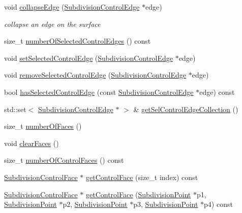 \begin{DoxyCompactItemize}
\item 
void \hyperlink{classShipCAD_1_1SubdivisionSurface_acb0b35c10fe6ab3c348f8435a1ca844d}{collapse\+Edge} (\hyperlink{classShipCAD_1_1SubdivisionControlEdge}{Subdivision\+Control\+Edge} $\ast$edge)
\begin{DoxyCompactList}\small\item\em collapse an edge on the surface \end{DoxyCompactList}\item 
size\+\_\+t \hyperlink{classShipCAD_1_1SubdivisionSurface_a5de7174c531ef00c607948496b3a8780}{number\+Of\+Selected\+Control\+Edges} () const 
\item 
void \hyperlink{classShipCAD_1_1SubdivisionSurface_ae1ceb8323935d0734fe4dc9c324aca16}{set\+Selected\+Control\+Edge} (\hyperlink{classShipCAD_1_1SubdivisionControlEdge}{Subdivision\+Control\+Edge} $\ast$edge)
\item 
void \hyperlink{classShipCAD_1_1SubdivisionSurface_a579077d742f9afc4e1d4ad20ef5a2184}{remove\+Selected\+Control\+Edge} (\hyperlink{classShipCAD_1_1SubdivisionControlEdge}{Subdivision\+Control\+Edge} $\ast$edge)
\item 
bool \hyperlink{classShipCAD_1_1SubdivisionSurface_a02868e9e5c98a74ce433cff169321967}{has\+Selected\+Control\+Edge} (const \hyperlink{classShipCAD_1_1SubdivisionControlEdge}{Subdivision\+Control\+Edge} $\ast$edge) const 
\item 
std\+::set$<$ \hyperlink{classShipCAD_1_1SubdivisionControlEdge}{Subdivision\+Control\+Edge} $\ast$ $>$ \& \hyperlink{classShipCAD_1_1SubdivisionSurface_ae6b7b4127e9c43273fcbf0cdeb88470d}{get\+Sel\+Control\+Edge\+Collection} ()
\item 
size\+\_\+t \hyperlink{classShipCAD_1_1SubdivisionSurface_a9f67bb8bbd3a8f61a2b4abacc0cf10e4}{number\+Of\+Faces} ()
\item 
void \hyperlink{classShipCAD_1_1SubdivisionSurface_abf11847b9df1bc590c6c51d292430dd5}{clear\+Faces} ()
\item 
size\+\_\+t \hyperlink{classShipCAD_1_1SubdivisionSurface_a6a735e1f8b3fdef0469ead5ed006e2a0}{number\+Of\+Control\+Faces} () const 
\item 
\hyperlink{classShipCAD_1_1SubdivisionControlFace}{Subdivision\+Control\+Face} $\ast$ \hyperlink{classShipCAD_1_1SubdivisionSurface_a9c7cbe0869e354a8aa43a43725abcfe8}{get\+Control\+Face} (size\+\_\+t index) const 
\item 
\hyperlink{classShipCAD_1_1SubdivisionControlFace}{Subdivision\+Control\+Face} $\ast$ \hyperlink{classShipCAD_1_1SubdivisionSurface_ad9de0db3b1f18a32edfb3bbbaed77bf0}{get\+Control\+Face} (\hyperlink{classShipCAD_1_1SubdivisionPoint}{Subdivision\+Point} $\ast$p1, \hyperlink{classShipCAD_1_1SubdivisionPoint}{Subdivision\+Point} $\ast$p2, \hyperlink{classShipCAD_1_1SubdivisionPoint}{Subdivision\+Point} $\ast$p3, \hyperlink{classShipCAD_1_1SubdivisionPoint}{Subdivision\+Point} $\ast$p4) const 

\end{DoxyCompactItemize}
